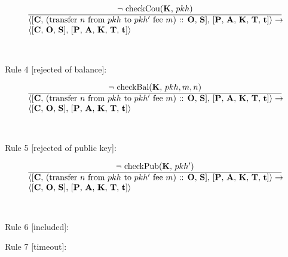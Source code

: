 \documentclass[a4paper]{llncs}
\begin{document}
\begin{equation}{}
\frac{\text{$\neg$ checkCou(\MANAGERS, $pkh$)}}{\parbox{4.2in}{\text{$\langle$[\ACCOUNTS, (transfer $n$ from $pkh$ to $pkh'$ fee $m$) :: \OPERATIONS, \CONTRACTS], [\PENDING, \ACCEPTED, \MANAGERS, \CONTRACTORS, \TIME]$\rangle \rightarrow$ }\\
\text{$\langle$[\ACCOUNTS, \OPERATIONS, \CONTRACTS], [\PENDING, \ACCEPTED, \MANAGERS, \CONTRACTORS, \TIME]$\rangle$}}} 
\end{equation}
~\\
~\\
Rule 4 [rejected of balance]:

\begin{equation}{}
\frac{\text{$\neg$ checkBal(\MANAGERS, $pkh, m, n$)}}{\parbox{4.2in}{\text{$\langle$[\ACCOUNTS, (transfer $n$ from $pkh$ to $pkh'$ fee $m$) :: \OPERATIONS, \CONTRACTS], [\PENDING, \ACCEPTED, \MANAGERS, \CONTRACTORS, \TIME]$\rangle \rightarrow$ }\\
\text{$\langle$[\ACCOUNTS, \OPERATIONS, \CONTRACTS], [\PENDING, \ACCEPTED, \MANAGERS, \CONTRACTORS, \TIME]$\rangle$}}} 
\end{equation}
~\\
~\\
Rule 5 [rejected of public key]:

\begin{equation}{}
\frac{\text{$\neg$ checkPub(\MANAGERS, $pkh'$)}}{\parbox{4.2in}{\text{$\langle$[\ACCOUNTS, (transfer $n$ from $pkh$ to $pkh'$ fee $m$) :: \OPERATIONS, \CONTRACTS], [\PENDING, \ACCEPTED, \MANAGERS, \CONTRACTORS, \TIME]$\rangle \rightarrow$ }\\
\text{$\langle$[\ACCOUNTS, \OPERATIONS, \CONTRACTS], [\PENDING, \ACCEPTED, \MANAGERS, \CONTRACTORS, \TIME]$\rangle$}}} 
\end{equation}
~\\
~\\
Rule 6 [included]:
\begin{mathpar}
\end{mathpar}
Rule 7 [timeout]:
\begin{mathpar}
\end{mathpar}
\end{document}

